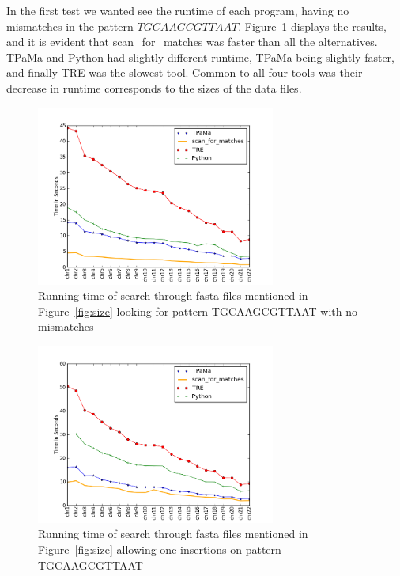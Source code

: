 In the first test we wanted see the runtime of each program, having no mismatches in the pattern $TGCAAGCGTTAAT$. Figure~\ref{fig:0miss} displays the results, and it is evident that scan\_for\_matches was faster than all the alternatives. TPaMa and Python had slightly different runtime, TPaMa being slightly faster, and finally TRE was the slowest tool. Common to all four tools was their decrease in runtime corresponds to the sizes of the data files.

\begin{figure}[h!]
\centering
\includegraphics[width=0.7\textwidth]{Benchmarking/0miss.png}
\caption{Running time of search through fasta files mentioned in Figure~\ref{fig:size} looking for pattern TGCAAGCGTTAAT with no mismatches}
\label{fig:0miss}
\end{figure}


\begin{figure}[h!]
\centering
\includegraphics[width=0.7\textwidth]{Benchmarking/1ins.png}
\caption{Running time of search through fasta files mentioned in Figure~\ref{fig:size} allowing one insertions on pattern TGCAAGCGTTAAT}
\label{fig:ins1}
\end{figure}


